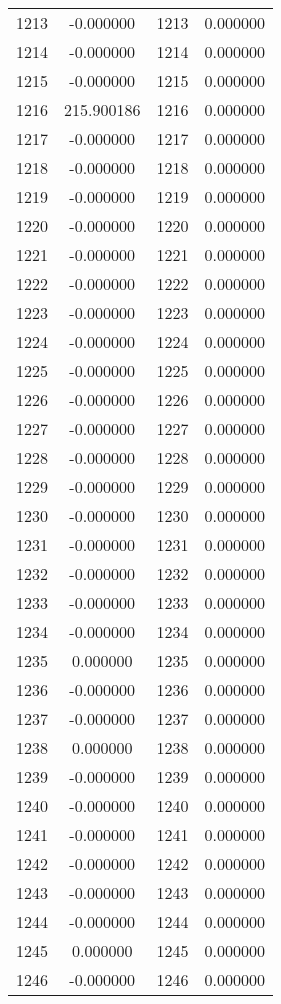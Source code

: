 \documentclass[12pt]{article}
\begin{document}
\begin{longtable}{@{}cccc@{}}
1213 & -0.000000 & 1213 & 0.000000 \\
1214 & -0.000000 & 1214 & 0.000000 \\
1215 & -0.000000 & 1215 & 0.000000 \\
1216 & 215.900186 & 1216 & 0.000000 \\
1217 & -0.000000 & 1217 & 0.000000 \\
1218 & -0.000000 & 1218 & 0.000000 \\
1219 & -0.000000 & 1219 & 0.000000 \\
1220 & -0.000000 & 1220 & 0.000000 \\
1221 & -0.000000 & 1221 & 0.000000 \\
1222 & -0.000000 & 1222 & 0.000000 \\
1223 & -0.000000 & 1223 & 0.000000 \\
1224 & -0.000000 & 1224 & 0.000000 \\
1225 & -0.000000 & 1225 & 0.000000 \\
1226 & -0.000000 & 1226 & 0.000000 \\
1227 & -0.000000 & 1227 & 0.000000 \\
1228 & -0.000000 & 1228 & 0.000000 \\
1229 & -0.000000 & 1229 & 0.000000 \\
1230 & -0.000000 & 1230 & 0.000000 \\
1231 & -0.000000 & 1231 & 0.000000 \\
1232 & -0.000000 & 1232 & 0.000000 \\
1233 & -0.000000 & 1233 & 0.000000 \\
1234 & -0.000000 & 1234 & 0.000000 \\
1235 & 0.000000 & 1235 & 0.000000 \\
1236 & -0.000000 & 1236 & 0.000000 \\
1237 & -0.000000 & 1237 & 0.000000 \\
1238 & 0.000000 & 1238 & 0.000000 \\
1239 & -0.000000 & 1239 & 0.000000 \\
1240 & -0.000000 & 1240 & 0.000000 \\
1241 & -0.000000 & 1241 & 0.000000 \\
1242 & -0.000000 & 1242 & 0.000000 \\
1243 & -0.000000 & 1243 & 0.000000 \\
1244 & -0.000000 & 1244 & 0.000000 \\
1245 & 0.000000 & 1245 & 0.000000 \\
1246 & -0.000000 & 1246 & 0.000000 \\

\end{longtable}
\end{document}
